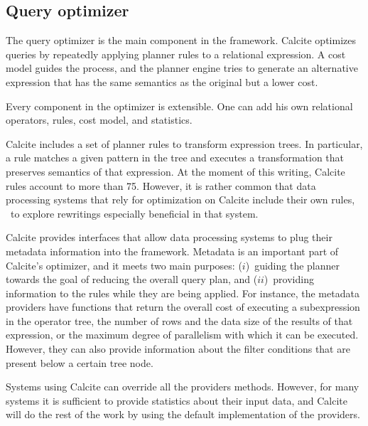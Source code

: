 \subsection{Query optimizer}
\label{subsec:optimizer}

The query optimizer is the main component in the framework. Calcite optimizes queries by repeatedly applying planner rules to a relational expression. A cost model guides the process, and the planner engine tries to generate an alternative expression that has the same semantics as the original but a lower cost.

Every component in the optimizer is extensible. One can add his own relational operators, rules, cost model, and statistics.

 Calcite includes a set of planner rules to transform expression trees. In particular, a rule matches a given pattern in the tree and executes a transformation that preserves semantics of that expression. At the moment of this writing, Calcite rules account to more than 75. However, it is rather common that data processing systems that rely for optimization on Calcite include their own rules, \eg\ to explore rewritings especially beneficial in that system.


 Calcite provides interfaces that allow data processing systems to plug their metadata information into the framework. Metadata is an important part of Calcite's optimizer, and it meets two main purposes: ($i$)~guiding the planner towards the goal of reducing the overall query plan, and ($ii$)~providing information to the rules while they are being applied. For instance, the metadata providers have functions that return the overall cost of executing a subexpression in the operator tree, the number of rows and the data size of the results of that expression, or the maximum degree of parallelism with which it can be executed. However, they can also provide information about the filter conditions that are present below a certain tree node.


Systems using Calcite can override all the providers methods. However, for many systems it is sufficient to provide statistics about their input data, and Calcite will do the rest of the work by using the default implementation of the providers.


